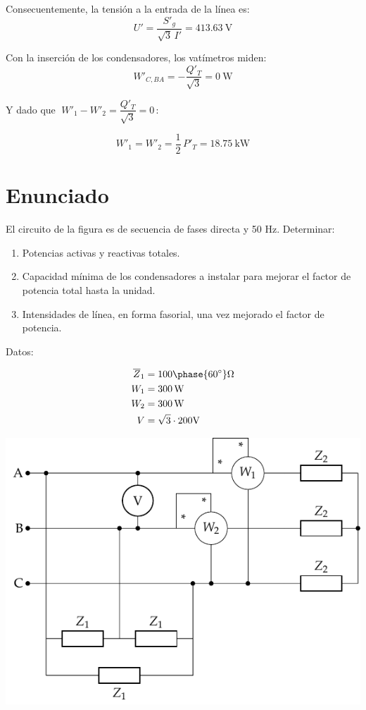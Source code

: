 Consecuentemente, la tensión a la entrada de la línea es:
\[
U' = \frac{S'_g}{\sqrt{3} \, I'} = \SI{413.63}{\volt}
\]

Con la inserción de los condensadores, los vatímetros miden:
\[
    W'_{C, BA} = - \frac{Q'_T}{\sqrt{3}} = \SI{0}{\watt}
\]

\vspace{-2mm}
Y dado que $\; W'_1 - W'_2 = \dfrac{Q'_T}{\sqrt{3}} = 0 \,$:

\[
    W'_1 = W'_2 = \frac{1}{2} \, P'_T = \SI{18.75}{\kilo\watt}
\]



\section{Enunciado}

El circuito de la figura es de secuencia de fases directa y 50 Hz. Determinar:
\begin{enumerate}
\item Potencias activas y reactivas totales.
\item Capacidad mínima de los condensadores a instalar para mejorar el factor de potencia total hasta la unidad.
\item Intensidades de línea, en forma fasorial, una vez mejorado el factor de potencia.
\end{enumerate}
\begin{minipage}{0.4\linewidth}
  Datos: 

  \begin{align*}
    \overline{Z}_1 &= {100\phase{\ang{60}}}\unit{\ohm}\\
    W_1 &= \SI{300}{\watt}\\
    W_2 &= \SI{300}{\watt}\\
    V &= {\sqrt{3} \cdot 200}\unit{\volt}
  \end{align*}
\end{minipage}
\begin{minipage}{0.6\linewidth}
  \begin{center}
    \includegraphics{figuras/ZyZt}
  \end{center}
\end{minipage}

